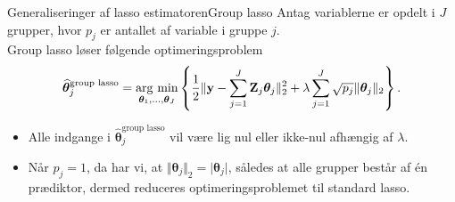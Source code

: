 \begin{frame}{Generaliseringer af lasso estimatoren}{Group lasso}
Antag variablerne er opdelt i \(J\) grupper, hvor \(p_j\) er antallet af variable i gruppe \(j\). \\

Group lasso løser følgende optimeringsproblem
\begin{align*}
\widehat{\boldsymbol{\theta}}_j^{\text{group lasso}} = \argmin_{\boldsymbol{\theta}_1, \ldots, \boldsymbol{\theta}_J} \cbr{\frac{1}{2} \Vert \mathbf{y} - \sum_{j=1}^J \mathbf{Z}_j \boldsymbol{\theta}_j \Vert_2^2 + \lambda \sum_{j=1}^J \sqrt{p_j} \Vert \boldsymbol{\theta}_j \Vert_2}.
\end{align*}
\begin{itemize}
\item Alle indgange i $\widehat{\boldsymbol{\theta}}_j^\text{group lasso}$ vil være lig nul eller ikke-nul afhængig af \(\lambda\).
\item Når $p_j=1$, da har vi, at $\Vert \boldsymbol{\theta}_j \Vert_2 = \vert \boldsymbol{\theta}_j \vert$, således at alle grupper består af én prædiktor, dermed reduceres optimeringsproblemet til standard lasso.
\end{itemize}
\end{frame}
%
